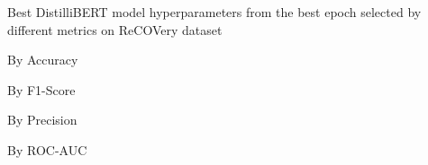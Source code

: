 \begin{table}[!htbp]
    \caption{Best DistilliBERT model hyperparameters from the best epoch selected by different metrics on ReCOVery dataset}
    \label{tab:recovery_distillibert_hparams}
    \centering

    \begin{subtable}[t]{0.48\linewidth}
        \scriptsize
        \caption{By Accuracy}
        
    \end{subtable}
    \hfill
    \begin{subtable}[t]{0.48\linewidth}
        \scriptsize
        \caption{By F1-Score}
        
    \end{subtable}

    \vspace{1em}

    \begin{subtable}[t]{0.48\linewidth}
        \scriptsize
        \caption{By Precision}
        
    \end{subtable}
    \hfill
    \begin{subtable}[t]{0.48\linewidth}
        \scriptsize
        \caption{By ROC-AUC}
        
    \end{subtable}


\end{table}